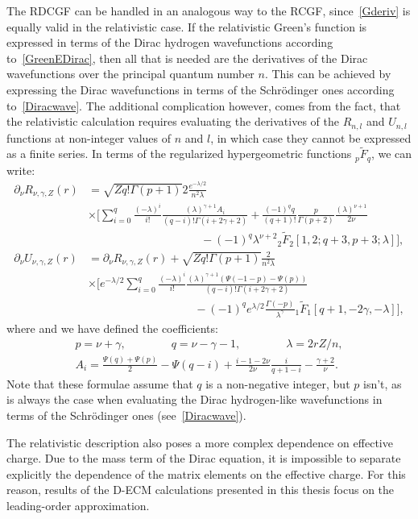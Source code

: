 The RDCGF can be handled in an analogous way to the RCGF, since~\eqref{Gderiv} is equally valid in the relativistic case. If the relativistic Green's function is expressed in terms of the Dirac hydrogen wavefunctions according to~\eqref{GreenEDirac}, then all that is needed are the derivatives of the Dirac wavefunctions over the principal quantum number $n$. This can be achieved by expressing the Dirac wavefunctions in terms of the Schr\"odinger ones according to~\eqref{Diracwave}. The additional complication however, comes from the fact, that the relativistic calculation requires evaluating the derivatives of the $R_{n,l}$ and $U_{n,l}$ functions at non-integer values of $n$ and $l$, in which case they cannot be expressed as a finite series. In terms of the regularized hypergeometric functions ${}_p\widetilde{F}_q$, we can write:
\begin{align}
\partial_{\nu} R_{\nu,\gamma,Z}(r) &= \sqrt{Z q!\Gamma(p+1)}2\frac{e^{-\lambda/2}}{n^2 \lambda} \nonumber
\\
&\times\Bigg[\sum_{i=0}^{q}\frac{(-\lambda)^{i}}{i!}\frac{(\lambda)^{\gamma+1}A_i}{(q-i)!\Gamma(i+2\gamma+2)} +\frac{(-1)^qq}{(q+1)!}\frac{p}{\Gamma(p+2)}\frac{(\lambda)^{\nu+1}}{2\nu} \nonumber 
\\
&\mspace{180mu}-(-1)^q\lambda^{\nu+2}{}_2\widetilde{F}_2[1,2;q+3,p+3;\lambda]\Bigg], 
\\
\partial_{\nu} U_{\nu,\gamma,Z}(r) &= \partial_{\nu} R_{\nu,\gamma,Z}(r)+\sqrt{Z q!\Gamma(p+1)}\frac{2}{n^2 \lambda} \nonumber
\\
&\times\Bigg[e^{-\lambda/2}\sum_{i=0}^{q}\frac{(-\lambda)^{i}}{i!}\frac{(\lambda)^{\gamma+1}(\Psi(-1-p)-\Psi(p))}{(q-i)!\Gamma(i+2\gamma+2)} \nonumber 
\\
&\mspace{170mu}-(-1)^q e^{\lambda/2}\frac{\Gamma(-p)}{\lambda^{\gamma}}{}_1\widetilde{F}_1[q+1,-2\gamma,-\lambda]\Bigg],
\end{align}
where  and we have defined the coefficients:
\begin{align}
p=\nu+\gamma, \qquad \qquad q=\nu-\gamma-1, \qquad \qquad \lambda=2rZ/n,
\\
  A_i =\frac{\Psi(q)+\Psi(p)}{2}-\Psi(q-i)+\frac{i-1-2\nu}{2\nu}\frac{i}{q+1-i}-\frac{\gamma+2}{\nu}.
\end{align}
Note that these formulae assume that $q$ is a non-negative integer, but $p$ isn't, as is always the case when evaluating the Dirac hydrogen-like wavefunctions in terms of the Schr\"odinger ones (see~\eqref{Diracwave}).

The relativistic description also poses a more
complex dependence on effective charge. Due to the mass term of the
Dirac equation, it is impossible to separate
explicitly the dependence of the matrix elements on the effective
charge. For this reason, results of the D-ECM calculations presented in this thesis focus on the leading-order
approximation.


